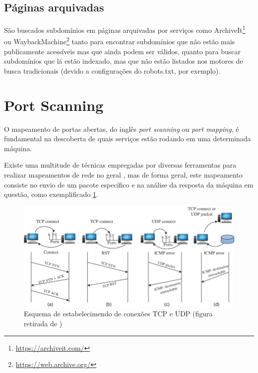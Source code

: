         \subsection{Páginas arquivadas} São buscados subdomínios em páginas arquivadas por serviços como ArchiveIt\footnote{\url{https://archiveit.com/}} ou WaybackMachine\footnote{\url{https://web.archive.org/}} tanto para encontrar subdomínios que não estão mais publicamente acessíveis mas que ainda podem ser válidos, quanto para buscar subdomínios que lá estão indexado, mas que não estão listados nos motores de busca tradicionais (devido a configurações do robots.txt, por exemplo).


\section{Port Scanning}

O mapeamento de portas abertas, do inglês \textit{port scanning} ou \textit{port mapping}, é fundamental na descoberta de quais serviços estão rodando em uma determinada máquina. 

Existe uma multitude de técnicas empregadas por diversas ferramentas para realizar mapeamentos de rede no geral \citep{de1999review}, mas de forma geral, este mapeamento consiste no envio de um pacote específico e na análise da resposta da máquina em questão, como exemplificado 
\ref{fig:tcpudp}.

\begin{figure}[H]
    \includegraphics[scale=0.5]{figuras/tcp_connection_scheme.png}
    \caption{Esquema de estabelecimendo de conexões TCP e UDP (figura retirada de \cite{tcpudpscans}) \label{fig:tcpudp}}
\end{figure}



